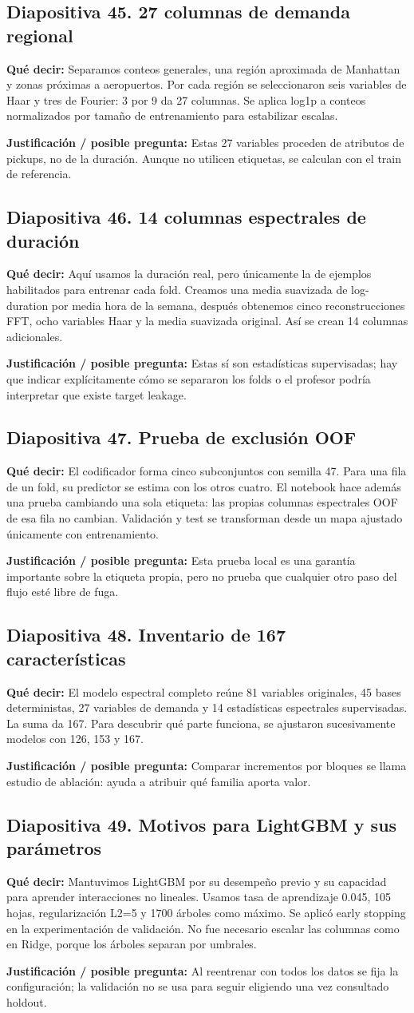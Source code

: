 \documentclass[11pt,letterpaper]{article}
\newcommand{\lamina}[2]{\subsection*{Diapositiva #1. #2}}
\newcommand{\explica}[1]{\noindent\textcolor{azul}{\textbf{Qué decir:}} #1\par\smallskip}
\newcommand{\defiende}[1]{\noindent\textcolor{verde}{\textbf{Justificación / posible pregunta:}} #1\par\medskip}
\begin{document}
\lamina{45}{27 columnas de demanda regional}
\explica{Separamos conteos generales, una región aproximada de Manhattan y zonas próximas a aeropuertos. Por cada región se seleccionaron seis variables de Haar y tres de Fourier: 3 por 9 da 27 columnas. Se aplica log1p a conteos normalizados por tamaño de entrenamiento para estabilizar escalas.}
\defiende{Estas 27 variables proceden de atributos de pickups, no de la duración. Aunque no utilicen etiquetas, se calculan con el train de referencia.}

\lamina{46}{14 columnas espectrales de duración}
\explica{Aquí usamos la duración real, pero únicamente la de ejemplos habilitados para entrenar cada fold. Creamos una media suavizada de log-duration por media hora de la semana, después obtenemos cinco reconstrucciones FFT, ocho variables Haar y la media suavizada original. Así se crean 14 columnas adicionales.}
\defiende{Estas sí son estadísticas supervisadas; hay que indicar explícitamente cómo se separaron los folds o el profesor podría interpretar que existe target leakage.}

\lamina{47}{Prueba de exclusión OOF}
\explica{El codificador forma cinco subconjuntos con semilla 47. Para una fila de un fold, su predictor se estima con los otros cuatro. El notebook hace además una prueba cambiando una sola etiqueta: las propias columnas espectrales OOF de esa fila no cambian. Validación y test se transforman desde un mapa ajustado únicamente con entrenamiento.}
\defiende{Esta prueba local es una garantía importante sobre la etiqueta propia, pero no prueba que cualquier otro paso del flujo esté libre de fuga.}

\lamina{48}{Inventario de 167 características}
\explica{El modelo espectral completo reúne 81 variables originales, 45 bases deterministas, 27 variables de demanda y 14 estadísticas espectrales supervisadas. La suma da 167. Para descubrir qué parte funciona, se ajustaron sucesivamente modelos con 126, 153 y 167.}
\defiende{Comparar incrementos por bloques se llama estudio de ablación: ayuda a atribuir qué familia aporta valor.}

\lamina{49}{Motivos para LightGBM y sus parámetros}
\explica{Mantuvimos LightGBM por su desempeño previo y su capacidad para aprender interacciones no lineales. Usamos tasa de aprendizaje 0.045, 105 hojas, regularización L2=5 y 1700 árboles como máximo. Se aplicó early stopping en la experimentación de validación. No fue necesario escalar las columnas como en Ridge, porque los árboles separan por umbrales.}
\defiende{Al reentrenar con todos los datos se fija la configuración; la validación no se usa para seguir eligiendo una vez consultado holdout.}
\end{document}
